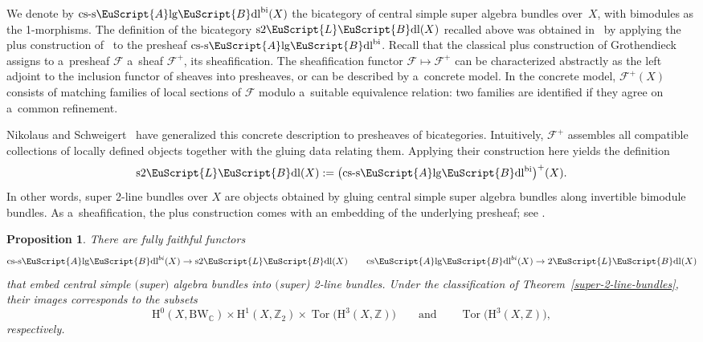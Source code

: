 \documentclass[pdftex]{sigma}
\numberwithin{equation}{section}
\newtheorem{Proposition}[Theorem]{Proposition}
 { \theoremstyle{definition}
\newtheorem{Definition}[Theorem]{Definition}
\newtheorem{Example}[Theorem]{Example}
\newtheorem{Remark}[Theorem]{Remark} }
\def\mathscr#1{\EuScript{#1}}
\def\Z {\mathbb{Z}}
\def\C {\mathbb{C}}
\def\h {\mathrm{H}}
\newcommand{\LineBdl}{\mathscr{L}\mathscr{B}\mathrm{dl}}
\newcommand{\twoLineBdl}{2\LineBdl}
\newcommand{\stwoLineBdl}{\mathrm{s}2\LineBdl}
\newcommand{\Alg}{\Incl\mathrm{lg}}
\newcommand{\csAlg}{\mathrm{cs}\Incl\mathrm{lg}}
\newcommand{\cssAlg}{\mathrm{cs\text{-}s}\Alg}
\newcommand{\csAlgBdl}{\csAlg\mathscr{B}\mathrm{dl}}
\newcommand{\cssAlgBdl}{\cssAlg\mathscr{B}\mathrm{dl}}
\newcommand{\cssAlgBdlbi}{\cssAlg\mathscr{B}\mathrm{dl}^{\mathrm{bi}}}
\newcommand{\Incl}{\mathscr{A}}
\def\quand{\qquad\text{and}\qquad}
\begin{document}
We denote by $\cssAlgBdlbi(X)$ the bicategory of central simple super algebra bundles over~$X$, with bimodules as the 1-morphisms.
The definition of the bicategory $\stwoLineBdl(X)$ recalled above was obtained in~\cite{Kristel2020} by applying the plus construction of~\cite{nikolaus2} to the presheaf $\cssAlgBdlbi$. Recall that the classical plus construction of Grothendieck assigns to a~presheaf $\mathcal{F}$ a~sheaf $\mathcal{F}^+$, its sheafification. The sheafification functor $\mathcal{F} \mapsto \mathcal{F}^+$ can be characterized abstractly as the left adjoint to the inclusion functor of sheaves into presheaves, or can be described by a~concrete model. In the concrete model, $\mathcal{F}^+(X)$ consists of matching families of local sections of $\mathcal{F}$ modulo a~suitable equivalence relation: two families are identified if they agree on a~common refinement.

Nikolaus and Schweigert~\cite{nikolaus2} have generalized this concrete description to presheaves of bicategories. Intuitively, $\mathcal{F}^+$ assembles all compatible collections of locally defined objects together with the gluing data relating them.
Applying their construction here yields the definition
\begin{equation*}
 \stwoLineBdl(X) := \bigl(\cssAlgBdlbi\bigr)^{+}(X).
\end{equation*}
In other words, super 2-line bundles over $X$ are objects obtained by gluing central simple super algebra bundles along invertible bimodule bundles.
As a~sheafification, the plus construction comes with an embedding of the underlying presheaf; see \cite[Section~3.3]{Kristel2020}.

\begin{Proposition}
\label{embedding-of-algebra-bundles}
There are fully faithful functors
\begin{equation*}
\cssAlgBdl^{bi}(X)\to \stwoLineBdl(X)
\qquad
\csAlgBdl^{bi}(X) \to \twoLineBdl(X)
\end{equation*}
that embed central simple $($super$)$ algebra bundles into $($super{\rm) 2}-line bundles. Under the classification of Theorem~{\rm\ref{super-2-line-bundles}}, their images corresponds to the subsets
\begin{equation*}
\h^0(X,\mathrm{BW}_{\C})\times \h^1(X,\Z_2) \times \operatorname{Tor}\bigl(\h^3(X,\Z)\bigr) \quand \operatorname{Tor}\bigl(\h^3(X,\Z)\bigr),
\end{equation*}
respectively.
\end{Proposition}
\end{document}
